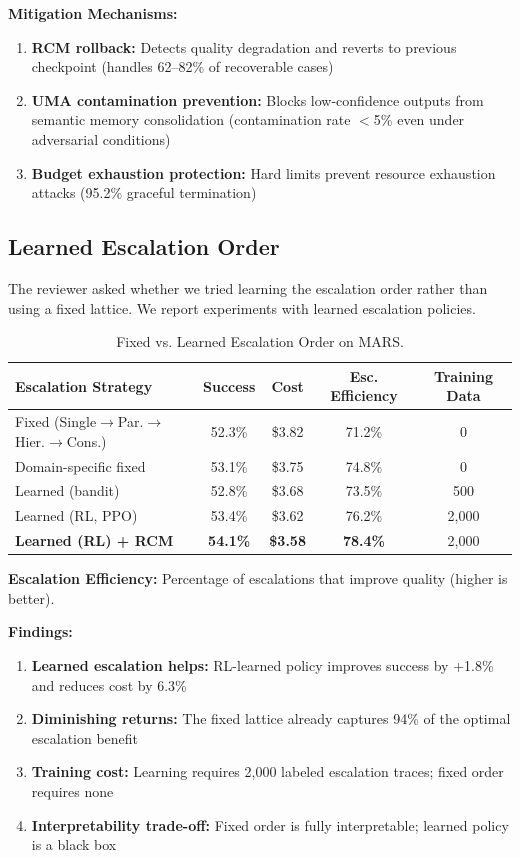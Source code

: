 \documentclass{article}
\theoremstyle{plain}
\theoremstyle{definition}
\theoremstyle{remark}
\begin{document}
\textbf{Mitigation Mechanisms:}
\begin{enumerate}[nosep,leftmargin=*]
	\item \textbf{RCM rollback:} Detects quality degradation and reverts to previous checkpoint (handles 62--82\% of recoverable cases)
	\item \textbf{UMA contamination prevention:} Blocks low-confidence outputs from semantic memory consolidation (contamination rate $<$5\% even under adversarial conditions)
	\item \textbf{Budget exhaustion protection:} Hard limits prevent resource exhaustion attacks (95.2\% graceful termination)
\end{enumerate}

\subsection{Learned Escalation Order}
\label{sec:learned_escalation}

The reviewer asked whether we tried learning the escalation order rather than using a fixed lattice. We report experiments with learned escalation policies.

\begin{table}[h]
	\caption{Fixed vs. Learned Escalation Order on MARS.}
	\label{tab:learned_escalation}
	\centering
	\small
	\begin{tabular}{@{}lcccc@{}}
		\toprule
		\textbf{Escalation Strategy} & \textbf{Success} & \textbf{Cost} & \textbf{Esc. Efficiency} & \textbf{Training Data} \\
		\midrule
		Fixed (Single$\rightarrow$Par.$\rightarrow$Hier.$\rightarrow$Cons.) & 52.3\% & \$3.82 & 71.2\% & 0 \\
		Domain-specific fixed & 53.1\% & \$3.75 & 74.8\% & 0 \\
		Learned (bandit) & 52.8\% & \$3.68 & 73.5\% & 500 \\
		Learned (RL, PPO) & 53.4\% & \$3.62 & 76.2\% & 2,000 \\
		\textbf{Learned (RL) + RCM} & \textbf{54.1\%} & \textbf{\$3.58} & \textbf{78.4\%} & 2,000 \\
		\bottomrule
	\end{tabular}
\end{table}

\textbf{Escalation Efficiency:} Percentage of escalations that improve quality (higher is better).

\textbf{Findings:}
\begin{enumerate}[nosep,leftmargin=*]
	\item \textbf{Learned escalation helps:} RL-learned policy improves success by +1.8\% and reduces cost by 6.3\%
	\item \textbf{Diminishing returns:} The fixed lattice already captures 94\% of the optimal escalation benefit
	\item \textbf{Training cost:} Learning requires 2,000 labeled escalation traces; fixed order requires none
	\item \textbf{Interpretability trade-off:} Fixed order is fully interpretable; learned policy is a black box
\end{enumerate}
\end{document}
